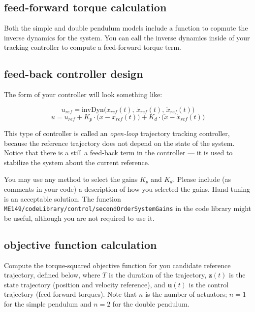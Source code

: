\subsection*{feed-forward torque calculation}

Both the simple and double pendulum models include
a function to copmute the inverse dynamics for the system.
You can call the inverse dynamics inside of your tracking controller to
compute a feed-forward torque term.

\subsection*{feed-back controller design}

The form of your controller will look something like:

\begin{equation}
  u_{ref} = \text{invDyn}\big(x_{ref}(t), \, \dot{x}_{ref}(t), \, \ddot{x}_{ref}(t) \big)
\end{equation}
\begin{equation}
  u = u_{ref} + K_p \cdot \big(x - x_{ref}(t)\big) + K_d \cdot \big(\dot{x} - \dot{x}_{ref}(t)\big)
\end{equation}

This type of controller is called an \textit{open-loop} trajectory tracking controller,
because the reference trajectory does not depend on the state of the system.
Notice that there is a still a feed-back term in the controller ---
it is used to stabilize the system about the current reference.

You may use any method to select the gains $K_p$ and $K_d$.
Please include (as comments in your code) a description of how you selected the gains.
Hand-tuning is an acceptable solution.
The function
\texttt{ME149/codeLibrary/control/secondOrderSystemGains}
in the code library might be useful, although you are not required to use it.

\subsection*{objective function calculation}

Compute the torque-squared objective function for you candidate reference trajectory,
defined below, where $T$ is the duration of the trajectory,
$\bm{z}(t)$ is the state trajectory (position and velocity reference), and
$\bm{u}(t)$ is the control trajectory (feed-forward torques).
Note that $n$ is the number of actuators;
$n=1$ for the simple pendulum and
$n=2$ for the double pendulum.

